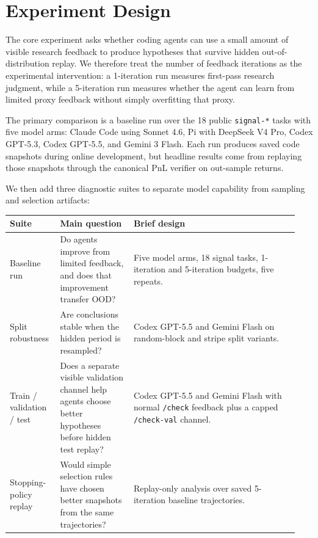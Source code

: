 \documentclass[
]{article}
\begin{document}
\section{Experiment Design}\label{experiment-design}

The core experiment asks whether coding agents can use a small amount of visible research feedback to produce hypotheses that survive hidden out-of-distribution replay. We therefore treat the number of feedback iterations as the experimental intervention: a 1-iteration run measures first-pass research judgment, while a 5-iteration run measures whether the agent can learn from limited proxy feedback without simply overfitting that proxy.

The primary comparison is a baseline run over the 18 public \texttt{signal-*} tasks with five model arms: Claude Code using Sonnet 4.6, Pi with DeepSeek V4 Pro, Codex GPT-5.3, Codex GPT-5.5, and Gemini 3 Flash. Each run produces saved code snapshots during online development, but headline results come from replaying those snapshots through the canonical PnL verifier on out-sample returns.

We then add three diagnostic suites to separate model capability from sampling and selection artifacts:

\begin{longtable}[]{@{}>{\raggedright\arraybackslash}p{0.16\linewidth}>{\raggedright\arraybackslash}p{0.24\linewidth}>{\raggedright\arraybackslash}p{0.54\linewidth}@{}}
\toprule\noalign{}
Suite & Main question & Brief design \\
\midrule\noalign{}
\endhead
\bottomrule\noalign{}
\endlastfoot
Baseline run & Do agents improve from limited feedback, and does that improvement transfer OOD? & Five model arms, 18 signal tasks, 1-iteration and 5-iteration budgets, five repeats. \\
Split robustness & Are conclusions stable when the hidden period is resampled? & Codex GPT-5.5 and Gemini Flash on random-block and stripe split variants. \\
Train / validation / test & Does a separate visible validation channel help agents choose better hypotheses before hidden test replay? & Codex GPT-5.5 and Gemini Flash with normal \texttt{/check} feedback plus a capped \texttt{/check-val} channel. \\
Stopping-policy replay & Would simple selection rules have chosen better snapshots from the same trajectories? & Replay-only analysis over saved 5-iteration baseline trajectories. \\
\end{longtable}
\end{document}
